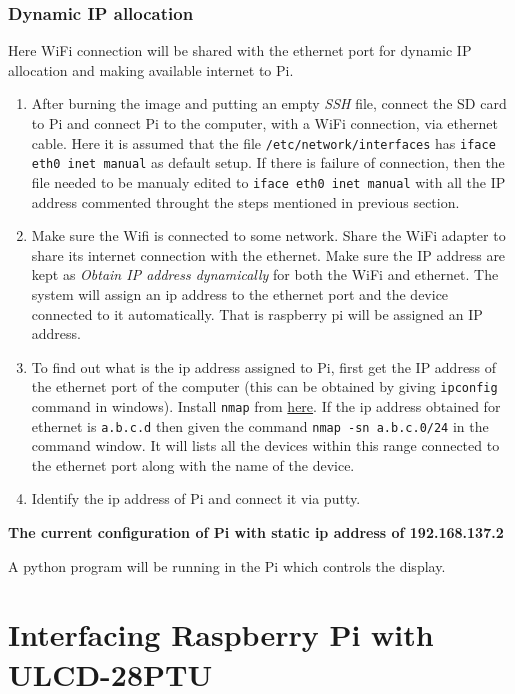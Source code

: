 \documentclass[12pt, a4paper, twoside]{article}
\begin{document}
\subsubsection{Dynamic IP allocation}
	Here WiFi connection will be shared with the ethernet port for dynamic IP allocation and making available internet to Pi.

	\begin{enumerate}
		\item After burning the image and putting an empty \textit{SSH} file, connect the SD card to Pi and connect Pi to the computer, with a WiFi connection, via ethernet cable. Here it is assumed that the file \texttt{/etc/network/interfaces} has \texttt{iface eth0 inet manual} as default setup. If there is failure of connection, then the file needed to be manualy edited to \texttt{iface eth0 inet manual} with all the IP address commented throught the steps mentioned in previous section.
		\item Make sure the Wifi is connected to some network. Share the WiFi adapter to share its internet connection with the ethernet. Make sure the IP address are kept as \textit {Obtain IP address dynamically} for both the WiFi and ethernet. The system will assign an ip address to the ethernet port and the device connected to it automatically. That is raspberry pi will be assigned an IP address.
		\item To find out what is the ip address assigned to Pi, first get the IP address of the ethernet port of the computer (this can be obtained by giving \texttt{ipconfig} command in windows). Install \texttt{nmap} from \href{https://nmap.org/download.html}{here}. If the ip address obtained for ethernet is \texttt{a.b.c.d} then given the command \texttt{nmap -sn a.b.c.0/24} in the command window. It will lists all the devices within this range connected to the ethernet port along with the name of the device.
		\item Identify the ip address of Pi and connect it via putty.
	\end{enumerate}

\textbf{The current configuration of Pi with static ip address of 192.168.137.2}

A python program will be running in the Pi which controls the display.

\section{Interfacing Raspberry Pi with ULCD-28PTU}
\end{document}

